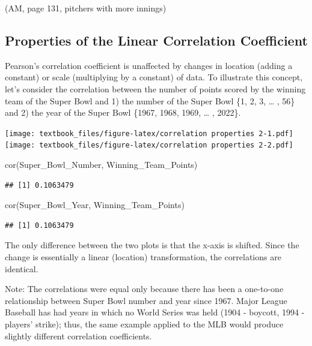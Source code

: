 \documentclass[
  11pt,
]{book}
\newenvironment{Shaded}{\begin{snugshade}}{\end{snugshade}}
\newcommand{\FunctionTok}[1]{\textcolor[rgb]{0.00,0.00,0.00}{#1}}
\newcommand{\NormalTok}[1]{#1}
\theoremstyle{definition}
\theoremstyle{definition}
\theoremstyle{definition}
\theoremstyle{definition}
\theoremstyle{remark}
\begin{document}
(AM, page 131, pitchers with more innings)

\hypertarget{properties-of-the-linear-correlation-coefficient}{%
\subsection{Properties of the Linear Correlation Coefficient}\label{properties-of-the-linear-correlation-coefficient}}

Pearson's correlation coefficient is unaffected by changes in location (adding a constant) or scale (multiplying by a constant) of data. To illustrate this concept, let's consider the correlation between the number of points scored by the winning team of the Super Bowl and 1) the number of the Super Bowl \{1, 2, 3, \ldots{} , 56\} and 2) the year of the Super Bowl \{1967, 1968, 1969, \ldots{} , 2022\}.

\texttt{[image: textbook\_files/figure-latex/correlation properties 2-1.pdf]} \texttt{[image: textbook\_files/figure-latex/correlation properties 2-2.pdf]}

\begin{Shaded}
\begin{Highlighting}[]
\FunctionTok{cor}\NormalTok{(Super\_Bowl\_Number, Winning\_Team\_Points)}
\end{Highlighting}
\end{Shaded}

\begin{verbatim}
## [1] 0.1063479
\end{verbatim}

\begin{Shaded}
\begin{Highlighting}[]
\FunctionTok{cor}\NormalTok{(Super\_Bowl\_Year, Winning\_Team\_Points)}
\end{Highlighting}
\end{Shaded}

\begin{verbatim}
## [1] 0.1063479
\end{verbatim}

The only difference between the two plots is that the x-axis is shifted. Since the change is essentially a linear (location) transformation, the correlations are identical.

Note: The correlations were equal only because there has been a one-to-one relationship between Super Bowl number and year since 1967. Major League Baseball has had years in which no World Series was held (1904 - boycott, 1994 - players' strike); thus, the same example applied to the MLB would produce slightly different correlation coefficients.
\end{document}
